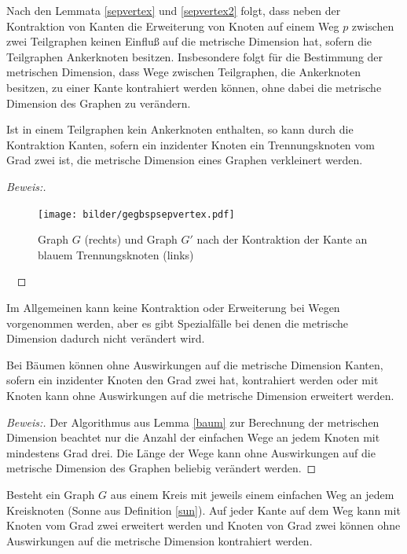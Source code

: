 \begin{bem}
Nach den Lemmata \ref{sepvertex} und \ref{sepvertex2} folgt, dass neben der Kontraktion von Kanten die Erweiterung von Knoten auf einem Weg $p$ zwischen zwei Teilgraphen keinen Einfluß auf die metrische Dimension hat, sofern die Teilgraphen Ankerknoten besitzen. Insbesondere folgt für die Bestimmung der metrischen Dimension, dass Wege zwischen Teilgraphen, die Ankerknoten besitzen, zu einer Kante kontrahiert werden können, ohne dabei die metrische Dimension des Graphen zu verändern.
\end{bem}
\begin{lem}
Ist in einem Teilgraphen kein Ankerknoten enthalten, so kann durch die Kontraktion Kanten, sofern ein inzidenter Knoten ein Trennungsknoten vom Grad zwei ist, die metrische Dimension eines Graphen verkleinert werden.
\end{lem}
\begin{proof}[Beweis:] ~ \newline
\vspace{-7mm}
\begin{figure}[!h]
\centering
\texttt{[image: bilder/gegbspsepvertex.pdf]}
\caption{Graph $G$ (rechts) und Graph $G'$ nach der Kontraktion der Kante an blauem Trennungsknoten (links)}
\end{figure} 
\vspace{-8mm}
~\linebreak
\end{proof}
Im Allgemeinen kann keine Kontraktion oder Erweiterung bei Wegen vorgenommen werden, aber es gibt Spezialfälle bei denen die metrische Dimension dadurch nicht verändert wird.
\begin{lem}
Bei Bäumen können ohne Auswirkungen auf die metrische Dimension Kanten, sofern ein inzidenter Knoten den Grad zwei hat, kontrahiert werden oder mit Knoten kann ohne Auswirkungen auf die metrische Dimension erweitert werden.
\end{lem}
\begin{proof}[Beweis:]
Der Algorithmus aus Lemma \ref{baum} zur Berechnung der metrischen Dimension beachtet nur die Anzahl der einfachen Wege an jedem Knoten mit mindestens Grad drei. Die Länge der Wege kann ohne Auswirkungen auf die metrische Dimension des Graphen beliebig verändert werden.
\end{proof}
\begin{lem}
\label{sonneerweiterung}
Besteht ein Graph $G$ aus einem Kreis mit jeweils einem einfachen Weg an jedem Kreisknoten (Sonne aus Definition \ref{sun}). Auf jeder Kante auf dem Weg kann mit Knoten vom Grad zwei erweitert werden und Knoten von Grad zwei können ohne Auswirkungen auf die metrische Dimension kontrahiert werden.
\end{lem}

